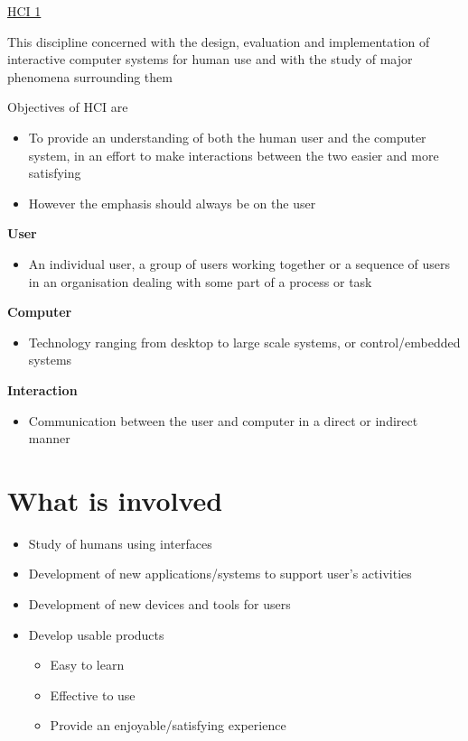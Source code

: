 \documentclass{article}[18pt]
\begin{document}
\begin{center}
\underline{\huge HCI 1}
\end{center}
\begin{defin}[HCI]
This discipline concerned with the design, evaluation and implementation of interactive computer systems for human use and with the study of major phenomena surrounding them
\end{defin}
Objectives of HCI are
\begin{itemize}
	\item To provide an understanding of both the human user and the computer system, in an effort to make interactions between the two easier and more satisfying
	\item However the emphasis should always be on the user
\end{itemize}
\textbf{User}
\begin{itemize}
	\item An individual user, a group of users working together or a sequence of users in an organisation dealing with some part of a process or task
\end{itemize}
\textbf{Computer}
\begin{itemize}
	\item Technology ranging from desktop to large scale systems, or control/embedded systems
\end{itemize}
\textbf{Interaction}
\begin{itemize}
	\item Communication between the user and computer in a direct or indirect manner
\end{itemize}
\section{What is involved}
\begin{itemize}
	\item Study of humans using interfaces
	\item Development of new applications/systems to support user's activities
	\item Development of new devices and tools for users
	\item Develop usable products
	\begin{itemize}
		\item Easy to learn
		\item Effective to use
		\item Provide an enjoyable/satisfying experience
	\end{itemize}
\end{itemize}
\end{document}
